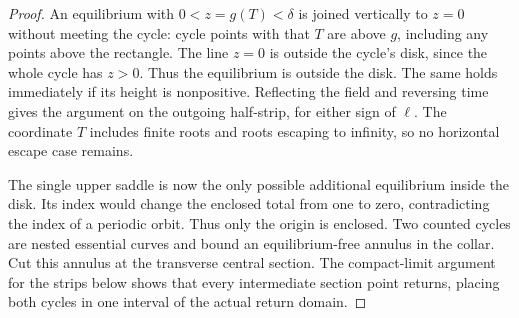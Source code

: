 \begin{proof}
An equilibrium with $0<z=g(T)<\delta$ is joined vertically to
$z=0$ without meeting the cycle: cycle points with that $T$
are above $g$, including any points above the rectangle.
The line $z=0$ is outside the cycle's disk, since the whole
cycle has $z>0$. Thus the equilibrium is outside the disk.
The same holds immediately if its height is nonpositive.
Reflecting the field and reversing time gives the argument on
the outgoing half-strip, for either sign of $\ell$.
The coordinate $T$ includes finite roots and roots escaping
to infinity, so no horizontal escape case remains.

The single upper saddle is now the only possible additional
equilibrium inside the disk. Its index would change the enclosed total
from one to zero, contradicting the index of a periodic orbit. Thus
only the origin is enclosed. Two counted cycles are nested essential
curves and bound an equilibrium-free annulus in the collar. Cut this
annulus at the transverse central section. The compact-limit argument
for the strips below shows that every intermediate section point
returns, placing both cycles in one interval of the actual return
domain.
\end{proof}

